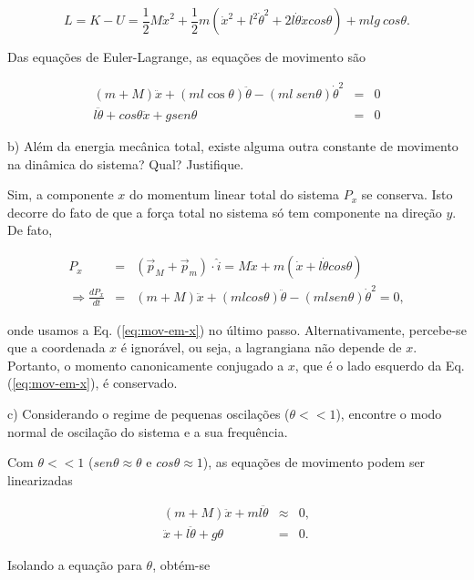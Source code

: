 \begin{enumerate}[start=1,label={\bfseries Q\arabic*.}]
$$
L = K - U = \frac{1}{2} M \dot{x}^{2} + \frac{1}{2} m \left( \dot{x}^{2} + l^{2} \dot{\theta}^{2} + 2 l\dot{\theta}\dot{x}cos \theta   \right) + mlg \ cos \theta.
$$

Das equações de Euler-Lagrange, as equações de movimento são

\begin{eqnarray}\label{eq:mov-em-x}
(m + M) \ddot{x} + (ml \cos \theta) \ddot{\theta} - (ml \ sen \theta) \dot{\theta}^{2} &=& 0 \\
l \ddot{\theta} + cos \theta \ddot{x} + g sen \theta &=& 0
\end{eqnarray}


b) Além da energia mecânica total, existe alguma outra constante de movimento na dinâmica do sistema?          Qual? Justifique.

\resposta

Sim, a componente $x$ do momentum linear total do sistema $P_{x}$ se conserva. Isto decorre do fato de que a força total no sistema só tem componente na direção $y$. De fato,

\begin{eqnarray*}
P_{x} &=& (\vec{p}_{M} + \vec{p}_{m})\cdot \hat{i} = M\dot{x} + m (\dot{x} + l \dot{\theta} cos \theta) \\
\Rightarrow \frac{dP_{x}}{dt} &=& (m+M)\ddot{x} + (mlcos\theta)\ddot{\theta} - (mlsen\theta)\dot{\theta}^{2} = 0,
\end{eqnarray*}

onde usamos a Eq. (\ref{eq:mov-em-x}) no último passo. Alternativamente, percebe-se que a coordenada $x$ é ignorável, ou seja, a lagrangiana não depende de $x$. Portanto, o momento canonicamente conjugado a $x$, que é o lado esquerdo da Eq. (\ref{eq:mov-em-x}), é conservado.


c) Considerando o regime de pequenas oscilações ($\theta << 1$), encontre o modo normal de oscilação do sistema e a sua frequência.

\resposta

Com $\theta << 1$ ($sen \theta \approx \theta$ e $cos \theta \approx 1$), as equações de movimento podem ser linearizadas

\begin{align}
(m+M)\ddot{x} + ml\ddot{\theta} &\approx & 0, \label{eq:linearizadas1} \\
\ddot{x} + l\ddot{\theta} + g \theta &=& 0.  \label{eq:linearizadas2}
\end{align}

Isolando a equação para $\theta$, obtém-se


\end{enumerate}
